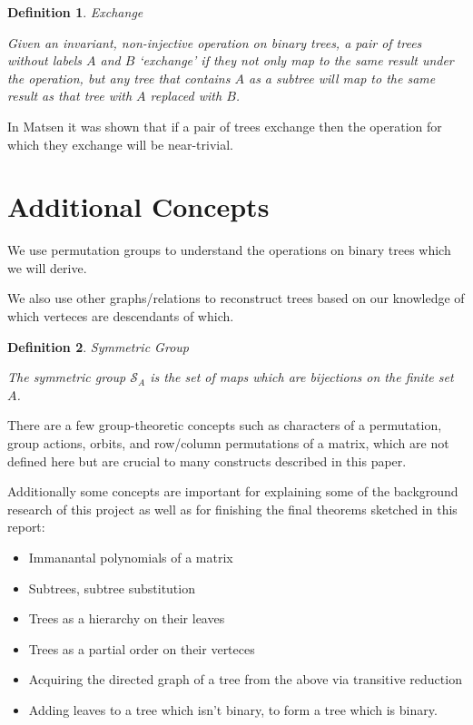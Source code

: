 \documentclass[10pt,a4paper]{report}
\newcommand{\S}{\mathcal{S}}
\newtheorem{definition}{Definition}
\begin{document}
\begin{definition} Exchange

	Given an invariant, non-injective operation on binary trees, a pair of
	trees without labels $A$ and $B$ `exchange' if they not only map to the same
	result under the operation, but any tree that contains $A$ as a subtree will
	map to the same result as that tree with $A$ replaced with $B$.
\end{definition}

In Matsen it was shown that if a pair of trees exchange then the operation for
which they exchange will be near-trivial.

\section{Additional Concepts}

We use permutation groups to understand the operations on binary trees which we will derive.

We also use other graphs/relations to reconstruct trees based on our knowledge of which verteces are descendants of which.

\begin{definition} Symmetric Group

	The symmetric group $\S_A$ is the set of maps which are bijections on the finite set $A$.
\end{definition}

There are a few group-theoretic concepts such as characters of a permutation, group actions, orbits, and row/column permutations of a matrix, which are not defined here but are crucial to many constructs described in this paper.

Additionally some concepts are important for explaining some of the background research of this project as well as for finishing the final theorems sketched in this report:
\begin{itemize}
	\item Immanantal polynomials of a matrix
	\item Subtrees, subtree substitution
	\item Trees as a hierarchy on their leaves
	\item Trees as a partial order on their verteces
	\item Acquiring the directed graph of a tree from the above via transitive reduction
	\item Adding leaves to a tree which isn't binary, to form a tree which is binary.
\end{itemize}
\end{document}
